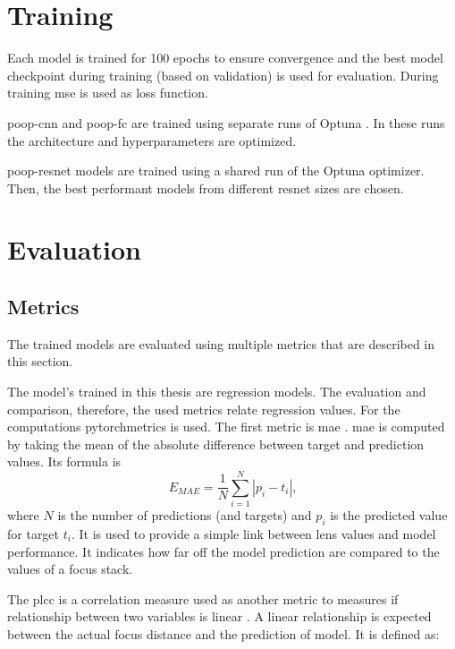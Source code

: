 \section{Training}
\label{sec:Methods:Training}

Each model is trained for 100 epochs to ensure convergence and the best model checkpoint during training (based on validation) is used for evaluation. During training \ac{mse} is used as loss function.

\Acs{poop}-\acs{cnn} and \acs{poop}-\acs{fc} are trained using separate runs of Optuna . In these runs the architecture and hyperparameters are optimized.

\Acs{poop}-\acs{resnet} models are trained using a shared run of the Optuna  optimizer. Then, the best performant models from different \acs{resnet} sizes are chosen.

\section{Evaluation}
\label{sec:Methods:Evaluation}

\subsection{Metrics}
\label{sec:Methods:Evaluation:Metrics}

The trained models are evaluated using multiple metrics that are described in this section.

The model's trained in this thesis are regression models. The evaluation and comparison, therefore, the used metrics relate regression values. For the computations pytorchmetrics  is used. The first metric is \ac{mae} . \Ac{mae} is computed by taking the mean of the absolute difference between target and prediction values. Its formula is $$E_{MAE} = \frac{1}{N}\sum_{i=1}^N |p_i - t_i| \text{,}$$ where $N$ is the number of predictions (and targets) and $p_i$ is the predicted value for target $t_i$.
It is used to provide a simple link between lens values and model performance. It indicates how far off the model prediction are compared to the values of a focus stack.

The \ac{plcc} \cite{pearson1909determination} is a correlation measure used as another metric to measures if relationship between two variables is linear \cite{profillidis2019statistical}. A linear relationship is expected between the actual focus distance and the prediction of model. It is defined as:

